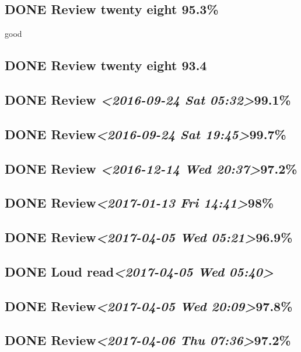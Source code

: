 \documentclass[11pt]{ctexart}
\begin{document}
\subsection{{\bfseries\sffamily DONE} Review twenty eight 95.3\%}
\label{sec:org63cb47b}
good
\subsection{{\bfseries\sffamily DONE} Review twenty eight 93.4}
\label{sec:org22aa746}

\subsection{{\bfseries\sffamily DONE} Review \textit{<2016-09-24 Sat 05:32>}99.1\%}
\label{sec:org5f0691a}
\subsection{{\bfseries\sffamily DONE} Review\textit{<2016-09-24 Sat 19:45>}99.7\%}
\label{sec:org446444e}
\subsection{{\bfseries\sffamily DONE} Review \textit{<2016-12-14 Wed 20:37>}97.2\%}
\label{sec:org20fc441}
\subsection{{\bfseries\sffamily DONE} Review\textit{<2017-01-13 Fri 14:41>}98\%}
\label{sec:org7d2f583}
\subsection{{\bfseries\sffamily DONE} Review\textit{<2017-04-05 Wed 05:21>}96.9\%}
\label{sec:org53e25b5}
\subsection{{\bfseries\sffamily DONE} Loud read\textit{<2017-04-05 Wed 05:40>}}
\label{sec:org144aa8e}
\subsection{{\bfseries\sffamily DONE} Review\textit{<2017-04-05 Wed 20:09>}97.8\%}
\label{sec:org6d59b9a}
\subsection{{\bfseries\sffamily DONE} Review\textit{<2017-04-06 Thu 07:36>}97.2\%}
\label{sec:orgfab23f8}
\end{document}
